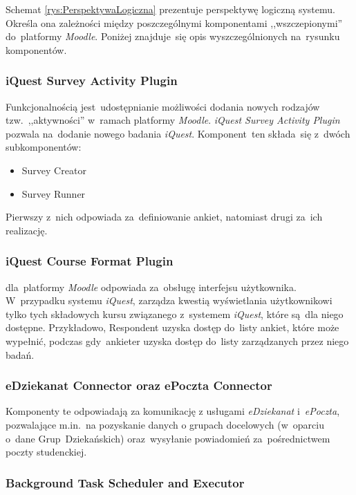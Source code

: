Schemat \ref{rys:PerspektywaLogiczna} prezentuje perspektywę logiczną systemu. Określa ona zależności między poszczególnymi komponentami ,,wszczepionymi'' do~platformy \textit{Moodle}. Poniżej znajduje~się opis wyszczególnionych na~rysunku komponentów.

\subsubsection{iQuest Survey Activity Plugin}
\label{Chapter5421}
Funkcjonalnością  jest~udostępnianie możliwości dodania nowych rodzajów tzw.~,,aktywności'' w~ramach platformy \textit{Moodle}. \textit{iQuest Survey Activity Plugin} pozwala na~dodanie nowego badania \textit{iQuest}. Komponent~ten składa~się z~dwóch subkomponentów:
\begin{itemize}
\item{Survey Creator}
\item{Survey Runner}
\end{itemize}
Pierwszy z~nich odpowiada za~definiowanie ankiet, natomiast drugi za~ich realizację.

\subsubsection{iQuest Course Format Plugin}
\label{Chapter5422}

 dla~platformy \textit{Moodle} odpowiada za~obsługę interfejsu użytkownika. W~przypadku systemu \textit{iQuest}, zarządza kwestią wyświetlania użytkownikowi tylko tych składowych kursu związanego z~systemem \textit{iQuest}, które są~dla niego dostępne. Przykładowo, Respondent uzyska dostęp do~listy ankiet, które może wypełnić, podczas gdy~ankieter uzyska dostęp do~listy zarządzanych przez niego badań.

\subsubsection{eDziekanat Connector oraz ePoczta Connector}
\label{Chapter5423}

Komponenty te odpowiadają za komunikację z usługami \textit{eDziekanat} i~\textit{ePoczta}, pozwalające m.in.~na pozyskanie danych o grupach docelowych (w~oparciu o~dane Grup~Dziekańskich) oraz~wysyłanie powiadomień za~pośrednictwem poczty studenckiej.

\subsubsection{Background Task Scheduler and Executor}
\label{Chapter5424}

